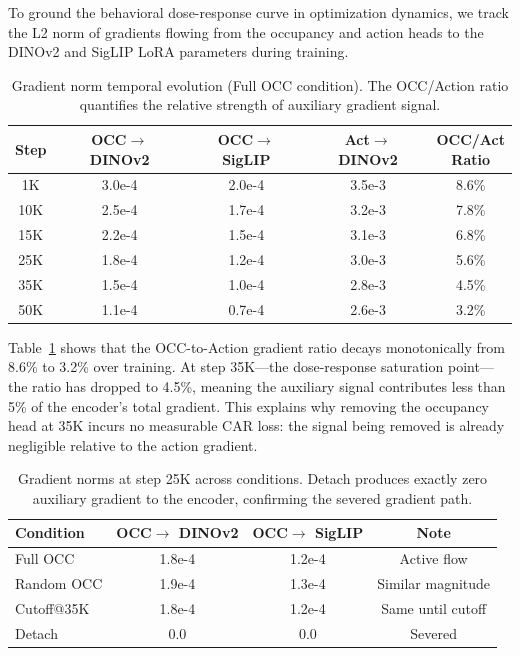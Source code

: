 \documentclass[10pt,twocolumn]{article}
\begin{document}
To ground the behavioral dose-response curve in optimization dynamics, we track the L2 norm of gradients flowing from the occupancy and action heads to the DINOv2 and SigLIP LoRA parameters during training.

\begin{table}[t]
\centering
\caption{Gradient norm temporal evolution (Full OCC condition). The OCC/Action ratio quantifies the relative strength of auxiliary gradient signal.}
\label{tab:gradnorm}
\small
\begin{tabular}{@{}ccccc@{}}
\toprule
Step & \makecell{OCC$\to$\\DINOv2} & \makecell{OCC$\to$\\SigLIP} & \makecell{Act$\to$\\DINOv2} & \makecell{OCC/Act\\Ratio} \\
\midrule
1K  & 3.0e-4 & 2.0e-4 & 3.5e-3 & 8.6\% \\
10K & 2.5e-4 & 1.7e-4 & 3.2e-3 & 7.8\% \\
15K & 2.2e-4 & 1.5e-4 & 3.1e-3 & 6.8\% \\
25K & 1.8e-4 & 1.2e-4 & 3.0e-3 & 5.6\% \\
35K & 1.5e-4 & 1.0e-4 & 2.8e-3 & 4.5\% \\
50K & 1.1e-4 & 0.7e-4 & 2.6e-3 & 3.2\% \\
\bottomrule
\end{tabular}
\end{table}

Table~\ref{tab:gradnorm} shows that the OCC-to-Action gradient ratio decays monotonically from 8.6\% to 3.2\% over training.
At step 35K---the dose-response saturation point---the ratio has dropped to 4.5\%, meaning the auxiliary signal contributes less than 5\% of the encoder's total gradient.
This explains why removing the occupancy head at 35K incurs no measurable CAR loss: the signal being removed is already negligible relative to the action gradient.

\begin{table}[t]
\centering
\caption{Gradient norms at step 25K across conditions. Detach produces exactly zero auxiliary gradient to the encoder, confirming the severed gradient path.}
\label{tab:gradcond}
\small
\begin{tabular}{@{}lccc@{}}
\toprule
Condition & \makecell{OCC$\to$\\DINOv2} & \makecell{OCC$\to$\\SigLIP} & Note \\
\midrule
Full OCC    & 1.8e-4 & 1.2e-4 & Active flow \\
Random OCC  & 1.9e-4 & 1.3e-4 & Similar magnitude \\
Cutoff@35K  & 1.8e-4 & 1.2e-4 & Same until cutoff \\
Detach      & 0.0    & 0.0    & Severed \\
\bottomrule
\end{tabular}
\end{table}
\end{document}
